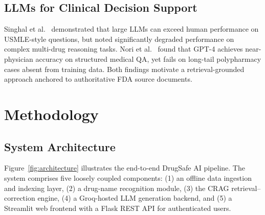 \documentclass[10pt, twocolumn]{article}
\begin{document}
\subsection{LLMs for Clinical Decision Support}

Singhal et al.\ \cite{singhal2023large} demonstrated that large LLMs can
exceed human performance on USMLE-style questions, but noted
significantly degraded performance on complex multi-drug reasoning tasks.
Nori et al.\ \cite{nori2023capabilities} found that GPT-4 achieves
near-physician accuracy on structured medical QA, yet fails on long-tail
polypharmacy cases absent from training data.  Both findings motivate a
retrieval-grounded approach anchored to authoritative FDA source
documents.

\section{Methodology}
\label{sec:method}

\subsection{System Architecture}

Figure~\ref{fig:architecture} illustrates the end-to-end DrugSafe AI
pipeline.  The system comprises five loosely coupled components: (1) an
offline data ingestion and indexing layer, (2) a drug-name recognition
module, (3) the CRAG retrieval--correction engine, (4) a Groq-hosted LLM
generation backend, and (5) a Streamlit web frontend with a Flask REST
API for authenticated users.
\end{document}
